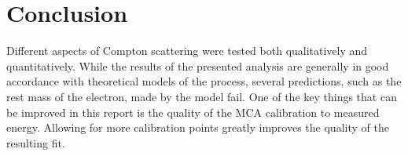 
\section{Conclusion}
\label{sec:conclusion}

Different aspects of Compton scattering were tested both qualitatively and
quantitatively. While the results of the presented analysis are generally in good
accordance with theoretical models of the process, several predictions, such as
the rest mass of the electron, made by the model fail. One of the key things that
can be improved in this report is the quality of the MCA calibration to measured
energy. Allowing for more calibration points greatly improves the quality of the
resulting fit.
